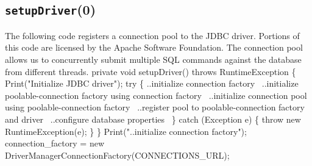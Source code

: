 \documentclass{article}
\def\nwendcode{\endtrivlist \endgroup}      %
\let\nwdocspar=\par
\theoremstyle{definition}                   %
\begin{document}
\subsection{{\tt{}\protect{}setupDriver}(0)}
The following code registers a connection pool to the JDBC driver.  Portions of
this code are licensed by the Apache Software Foundation.  The connection pool
allows us to concurrently submit multiple SQL commands against the database
from different threads.
\nwenddocs{}\endmoddef{}
private void setupDriver() throws RuntimeException \{
  Print("Initialize JDBC driver");
  try \{
    \LA{}..initialize connection factory~{\nwtagstyle{}}\RA{}
    \LA{}..initialize poolable-connection factory using connection factory~{\nwtagstyle{}}\RA{}
    \LA{}..initialize connection pool using poolable-connection factory~{\nwtagstyle{}}\RA{}
    \LA{}..register pool to poolable-connection factory and driver~{\nwtagstyle{}}\RA{}
    \LA{}..configure database properties~{\nwtagstyle{}}\RA{}
  \} catch (Exception e) \{
    throw new RuntimeException(e);
  \}
\}
\eatline
{}\nwendcode{}\endmoddef{}
Print("..initialize connection factory");
connection_factory = new DriverManagerConnectionFactory(CONNECTIONS_URL);
\nwendcode{}\nwdocspar
\end{document}
